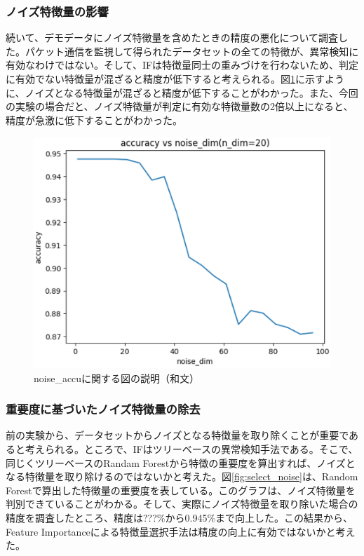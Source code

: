 \documentclass{css}
\begin{document}
\subsubsection{ノイズ特徴量の影響}
続いて、デモデータにノイズ特徴量を含めたときの精度の悪化について調査した。パケット通信を監視して得られたデータセットの全ての特徴が、異常検知に有効なわけではない。そして、IFは特徴量同士の重みづけを行わないため、判定に有効でない特徴量が混ざると精度が低下すると考えられる。図\ref{fig:noise_accu}に示すように、ノイズとなる特徴量が混ざると精度が低下することがわかった。また、今回の実験の場合だと、ノイズ特徴量が判定に有効な特徴量数の2倍以上になると、精度が急激に低下することがわかった。

\begin{figure}[tb]
    \centering
    \includegraphics[width=\linewidth]{pictures/eps/noise_accu.eps}
    \caption{noise\_accuに関する図の説明（和文）}
    \label{fig:noise_accu}
\end{figure}

\subsubsection{重要度に基づいたノイズ特徴量の除去}
前の実験から、データセットからノイズとなる特徴量を取り除くことが重要であると考えられる。ところで、IFはツリーベースの異常検知手法である。そこで、同じくツリーベースのRandam Forestから特徴の重要度を算出すれば、ノイズとなる特徴量を取り除けるのではないかと考えた。図\ref{fig:select_noise}は、Random Forestで算出した特徴量の重要度を表している。このグラフは、ノイズ特徴量を判別できていることがわかる。そして、実際にノイズ特徴量を取り除いた場合の精度を調査したところ、精度は???\%から0.945\%まで向上した。この結果から、Feature Importanceによる特徴量選択手法は精度の向上に有効ではないかと考えた。
\end{document}
